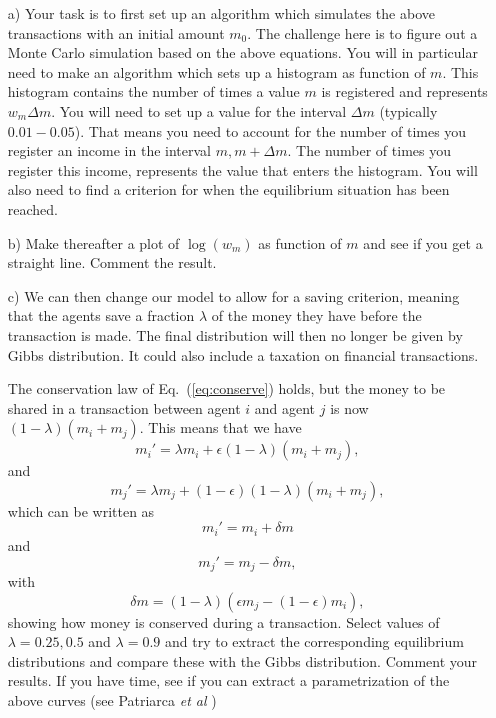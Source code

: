 \begin{prob}
\begin{enumerate}
\item[a)] Your task is to first set up an algorithm which simulates the above transactions with an initial
amount $m_0$.
The challenge here is to figure out a Monte Carlo  simulation  based on the
above equations.  
You will in particular need to make an algorithm which sets up a histogram as function of $m$.
This histogram contains the number of times a value $m$ is registered and represents
$w_m\Delta m$. You will need to set up a value for the interval $\Delta m$  (typically $0.01-0.05$).
That means you need to account for the number of times you register an income in the interval
$m,m+\Delta m$. The number of times you register this income, represents the value that enters the histogram.
You will also need to find a criterion for when the equilibrium situation has been reached.

\item[b)] Make thereafter a plot of  $\log{(w_m)}$ as function of $m$
and see if you get a straight line. 
Comment the result.

\item[c)] We can then change our model to allow for a saving criterion, meaning that the agents save
a fraction $\lambda$ of the money they have before the transaction is made. The final distribution will then no longer be given by Gibbs distribution. It could also include a taxation on financial transactions.

The conservation law of Eq.~(\ref{eq:conserve}) holds, but the money to be shared in a transaction between
agent $i$ and agent $j$ is now $(1-\lambda)(m_i+m_j)$. This means that we have 
\[
m_i' = \lambda m_i+\epsilon(1-\lambda)(m_i+m_j),
\]
and 
\[
m_j' = \lambda m_j+(1-\epsilon)(1-\lambda)(m_i+m_j),
\]
which can be written as 
\[
m_i'=m_i+\delta m
\]
and 
\[
m_j'=m_j-\delta m,
\]
with 
\[
\delta m=(1-\lambda)(\epsilon m_j-(1-\epsilon)m_i),
\]
showing how money is conserved during a transaction.
Select values of $\lambda =0.25,0.5$ and $\lambda=0.9$ and try to extract the corresponding
equilibrium distributions and compare these with the Gibbs distribution. Comment your results.
If you have time, see if you can extract a parametrization of the above curves (see 
Patriarca {\em et al} \cite{patriarca2004}) 
\end{enumerate}

\end{prob}



